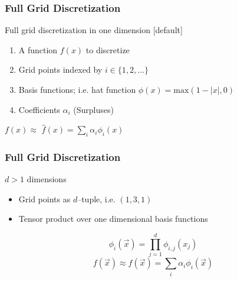 \begin{frame}
  \frametitle{Full Grid Discretization}
  \topline
  \vspace{-10px}
  \begin{block}{Full grid discretization in one dimension}
    [default]
    \begin{enumerate}
    \item A function $f(x)$ to discretize
    \item Grid points indexed by $i \in \{1,2,\dots\}$
    \item Basis functions; i.e. hat function $\phi(x)=\text{max}(1 - |x|, 0)$
    \item Coefficients $\alpha_i$ (Surpluses)
    \end{enumerate}
    \vspace{10px}
    \begin{center}
      $f(x) \approx$ $\hat{f}(x) = \sum_{i}^{}{\alpha_i \phi_i(x)}$
    \end{center}
  \end{block}
\end{frame}

\begin{frame}
  \frametitle{Full Grid Discretization}
  \topline
  \vspace{-10px}
  \begin{block}{$d > 1$ dimensions}
    \begin{itemize}
      \item Grid points as $d$--tuple, i.e. $(1,3,1)$
      \item Tensor product over one dimensional basis functions
    \end{itemize}
    \begin{center}
      $$ \phi_i(\vec{x}) = \prod_{j=1}^d{\phi_{i,j}(x_j)}$$
      $$ f(\vec{x}) \approx \hat{f}(\vec{x}) =
      \sum_i{\alpha_i\phi_i(\vec{x})}$$
    \end{center}
  \end{block}
\end{frame}

